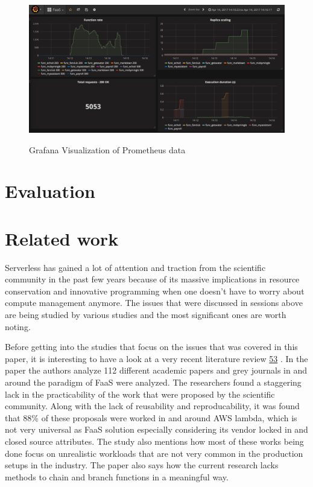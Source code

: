 \documentclass[12pt,titlepage]{article}
\begin{document}
\begin{figure}[!h]
    \caption{Grafana Visualization of Prometheus data}
    \centering
    \includegraphics[width=150mm]{./thesis_images/monitoring.jpeg}
    \label{fig:monitoring}
\end{figure}

\section{Evaluation}
\label{sec:orgd5c7065}
\section{Related work}
\label{sec:orgc8c1ea1}
Serverless has gained a lot of attention and traction from the scientific
community in the past few years because of its massive implications in resource
conservation and innovative programming when one doesn't have to worry about
compute management anymore. The issues that were discussed in sessions above are
being studied by various studies and the most significant ones are worth noting.

Before getting into the studies that focus on the issues that was covered in
this paper, it is interesting to have a look at  a very recent literature review \hyperref[ref:53]{53}
. In the paper the authors analyze 112 different academic papers
and grey journals in
and around the paradigm of FaaS were analyzed. The researchers found a
staggering lack in the practicability of the work that were proposed by the
scientific community. Along with the lack of reusability and reproducability, it
was found that 88\% of these proposals were worked in and around AWS lambda,
which is not very universal as FaaS solution especially considering its vendor
locked in and closed source attributes. The study also mentions how most of
these works being done focus on unrealistic workloads that are not very common
in the production setups in the industry. The paper also says how the current
research lacks methods to chain and branch functions in a meaningful way.
\end{document}
